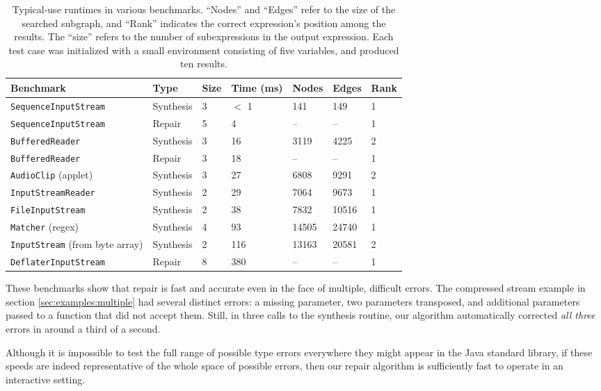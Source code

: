 \begin{table*}[hbt]
  \centering
  \begin{tabularx}{\linewidth}{| l | X | X | X | X | X | X |}
    \hline
    \textbf{Benchmark} & \textbf{Type} & \textbf{Size} & \textbf{Time (ms)} & \textbf{Nodes} & \textbf{Edges} & \textbf{Rank} \\ \hline
	\texttt{SequenceInputStream} & Synthesis & 3 & $<$ 1 & 141   & 149   & 1 \\ \hline
	\texttt{SequenceInputStream} & Repair    & 5 & 4   & --    & --    & 1 \\ \hline
    \texttt{BufferedReader}      & Synthesis & 3 & 16  & 3119  & 4225  & 2 \\ \hline
    \texttt{BufferedReader}      & Repair    & 3 & 18  & --    & --    & 1 \\ \hline
    \texttt{AudioClip} (applet)  & Synthesis & 3 & 27  & 6808  & 9291  & 2 \\ \hline
    \texttt{InputStreamReader}   & Synthesis & 2 & 29  & 7064  & 9673  & 1 \\ \hline
    \texttt{FileInputStream}     & Synthesis & 2 & 38  & 7832  & 10516 & 1 \\ \hline
    \texttt{Matcher} (regex)     & Synthesis & 4 & 93  & 14505 & 24740 & 1 \\ \hline
    \texttt{InputStream} (from byte array) & Synthesis & 2 & 116 & 13163  & 20581  & 2 \\ \hline
    \texttt{DeflaterInputStream} & Repair & 8    & 380 & -- & -- & 1 \\ \hline
  \end{tabularx}
  \caption{Typical-use runtimes in various benchmarks. ``Nodes'' and ``Edges'' refer to the size of the searched subgraph, and ``Rank'' indicates the correct expression's position among the results. The ``size'' refers to the number of subexpressions in the output expression. Each test case was initialized with a small environment consisting of five variables, and produced ten results.}
  \vspace{-1em}
  \label{eval:runtime}
\end{table*}

These benchmarks show that repair is fast and accurate even in the face of multiple, difficult errors. The compressed stream example in section \ref{sec:examples:multiple} had several distinct errors: a missing parameter, two parameters transposed, and additional parameters passed to a function that did not accept them. Still, in three calls to the synthesis routine, our algorithm automatically corrected \textit{all three} errors in around a third of a second.

Although it is impossible to test the full range of possible type errors everywhere they might appear in the Java standard library, if these speeds are indeed representative of the whole space of possible errors, then our repair algorithm is sufficiently fast to operate in an interactive setting.
